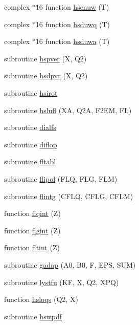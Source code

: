 \begin{DoxyCompactItemize}
complex $\ast$16 function \hyperlink{djangoh__h_8f_a50aabf7c37bed0881be627fd865176af}{hsenuw} (T)
\item 
complex $\ast$16 function \hyperlink{djangoh__h_8f_a57691fd114f710060efd3c5ef1fc0a45}{hsduwq} (T)
\item 
complex $\ast$16 function \hyperlink{djangoh__h_8f_afe5273222943b51794b89c1840ac6eb3}{hsduwa} (T)
\item 
subroutine \hyperlink{djangoh__h_8f_aa40c6a855b7d29b0a422c53c6f672ea4}{hspver} (X, Q2)
\item 
subroutine \hyperlink{djangoh__h_8f_a036460f40105c386bb59c0ba11b4646b}{hsdpvr} (X, Q2)
\item 
subroutine \hyperlink{djangoh__h_8f_a243cf7ba8798a80242e649f4a13e10ad}{hsirot}
\item 
subroutine \hyperlink{djangoh__h_8f_a889eab824e641752043b6bae2c8aba72}{hslufl} (X\+A, Q2\+A, F2\+E\+M, F\+L)
\item 
subroutine \hyperlink{djangoh__h_8f_a39c10764d264dab5d56cc9fea546fa7e}{dialfs}
\item 
subroutine \hyperlink{djangoh__h_8f_af3db73fbfc8ef656d8b70e305ebf58f2}{diflop}
\item 
subroutine \hyperlink{djangoh__h_8f_adf34c55e43074be390c1c3f2bde92bc3}{fltabl}
\item 
subroutine \hyperlink{djangoh__h_8f_a0226d8583377f82616c48b44ef284119}{flipol} (F\+L\+Q, F\+L\+G, F\+L\+M)
\item 
subroutine \hyperlink{djangoh__h_8f_a6de15161311de51e36c1b5198994fdeb}{flintg} (C\+F\+L\+Q, C\+F\+L\+G, C\+F\+L\+M)
\item 
function \hyperlink{djangoh__h_8f_a3c1cd7a5e1771b2b02f7c1dac1a0e13a}{flqint} (Z)
\item 
function \hyperlink{djangoh__h_8f_a812f71f71628752f444572335a346609}{flgint} (Z)
\item 
function \hyperlink{djangoh__h_8f_a9d7a0e00e9790a84c69fc6e1725267b3}{fltint} (Z)
\item 
subroutine \hyperlink{djangoh__h_8f_ac99ed93f4fc7c7fd1592d1dd4f744888}{gadap} (A0, B0, F, E\+P\+S, S\+U\+M)
\item 
subroutine \hyperlink{djangoh__h_8f_aa9010701221260844673a27f5bbae3b7}{lystfu} (K\+F, X, Q2, X\+P\+Q)
\item 
function \hyperlink{djangoh__h_8f_a60a33b63a3b4ec4bdfaf4a68935b607d}{hsloqs} (Q2, X)
\item 
subroutine \hyperlink{djangoh__h_8f_af5d882064b00cca058771df413ce65d5}{hswpdf}
\item 

\end{DoxyCompactItemize}

